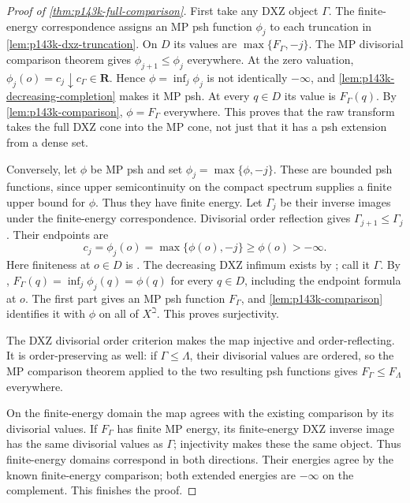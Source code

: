 \begin{proof}[Proof of \cref{thm:p143k-full-comparison}]
First take any DXZ object \(\Gamma\). The finite-energy correspondence
assigns an MP psh function \(\phi_j\) to each truncation in
\cref{lem:p143k-dxz-truncation}. On \(D\) its values are
\(\max\{F_\Gamma,-j\}\). The MP divisorial comparison theorem gives
\(\phi_{j+1}\leq\phi_j\) everywhere. At the zero valuation,
\(\phi_j(o)=c_j\downarrow c_\Gamma\in\mathbf R\).
Hence \(\phi=\inf_j\phi_j\) is not identically \(-\infty\), and
\cref{lem:p143k-decreasing-completion} makes it MP psh.
At every \(q\in D\) its value is \(F_\Gamma(q)\).
By \cref{lem:p143k-comparison}, \(\phi=F_\Gamma\) everywhere.
This proves that the raw transform takes the full DXZ cone into the
MP cone, not just that it has a psh extension from a dense set.

Conversely, let \(\phi\) be MP psh and set
\(\phi_j=\max\{\phi,-j\}\). These are bounded psh functions, since
upper semicontinuity on the compact spectrum supplies a finite upper
bound for \(\phi\). Thus they have finite energy.
Let \(\Gamma_j\) be their inverse images under the finite-energy
correspondence. Divisorial order reflection gives
\(\Gamma_{j+1}\leq\Gamma_j\).
Their endpoints are
\[
 c_j=\phi_j(o)=\max\{\phi(o),-j\}\geq\phi(o)>-\infty.
\]
Here finiteness at \(o\in D\) is
\cite[Theorem~4.3.3]{MP24}.
The decreasing DXZ infimum exists by
\cite[Definition~4.9]{Xia23}; call it \(\Gamma\).
By \cite[Lemma~4.10]{Xia23},
\(F_\Gamma(q)=\inf_j\phi_j(q)=\phi(q)\) for every \(q\in D\),
including the endpoint formula at \(o\).
The first part gives an MP psh function \(F_\Gamma\), and
\cref{lem:p143k-comparison} identifies it with \(\phi\) on all of
\(X^\beth\). This proves surjectivity.

The DXZ divisorial order criterion makes the map injective and
order-reflecting. It is order-preserving as well: if
\(\Gamma\leq\Lambda\), their divisorial values are ordered, so the
MP comparison theorem applied to the two resulting psh functions gives
\(F_\Gamma\leq F_\Lambda\) everywhere.

On the finite-energy domain the map agrees with the existing comparison
by its divisorial values. If \(F_\Gamma\) has finite MP energy, its
finite-energy DXZ inverse image has the same divisorial values as
\(\Gamma\); injectivity makes these the same object. Thus finite-energy
domains correspond in both directions. Their energies agree by the
known finite-energy comparison; both extended energies are
\(-\infty\) on the complement. This finishes the proof.
\end{proof}

